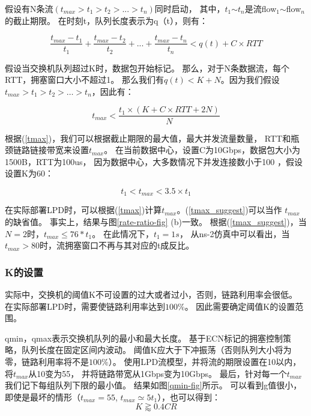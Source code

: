 假设有N条流$(t_{max}> t_1> t_2> ...> t_n)$同时启动，
其中，$t_1$$\sim$$t_n$是流flow$_1$$\sim$flow$_n$的截止期限。
在时刻t，队列长度表示为q（t），则有：

\begin{equation}
\label{tmaxprocess}
\frac{t_{max}-t_1}{t_1}+\frac{t_{max}-t_2}{t_2}+...+\frac{t_{max}-t_n}{t_n} <q(t)+C\times RTT
\end{equation}



假设当交换机队列超过K时，数据包开始标记。
那么，对于N条数据流，每个RTT，拥塞窗口大小不超过1。
那么我们有$q(t) < K+N$。因为我们假设$t_{max}>t_1>t_2>…>t_n$，因此有：


\begin{equation}
\label{tmax}
t_{max}<\frac{t_1\times(K+C\times RTT+2N)}{N}
\end{equation}

根据(\ref{tmax})，我们可以根据截止期限的最大值，最大并发流量数量，
RTT和瓶颈链路链接带宽来设置$t_{max}$。 
在当前数据中心，设置C为10Gbps，数据包大小为1500B，RTT为100us，
因为数据中心，大多数情况下并发连接数小于100 \cite{DCTCP}，假设设置K为60：


 \begin{equation}
\label{tmax_suggest}
t_1< t_{max}<3.5\times t_1
\end{equation}

在实际部署LPD时，可以根据(\ref{tmax})计算$t_{max}$。(\ref{tmax_suggest})可以当作 $t_{max}$的缺省值。
事实上，结果与图\ref{rate-ratio-fig} (b)一致。 
根据(\ref{tmax_suggest})，当$N = 2$时，$t_{max}\le76* t_1$。
在此情况下，$t_1 = 1s$， 从ns-2仿真中可以看出，当$t_{max}> 80$时，流拥塞窗口不再与其对应的t成反比。

\subsubsection{K的设置}
实际中，交换机的阈值K不可设置的过大或者过小，否则，链路利用率会很低。
在实际部署LPD时，需要使链路利用率达到$100\%$。
因此需要确定阈值K的设置范围\cite{DCTCPAnalysis}。

qmin，qmax表示交换机队列的最小和最大长度。
基于ECN标记的拥塞控制策略，队列长度在固定区间内波动。
阈值K应大于下冲振荡（否则队列大小将为零，链路利用率将不是$100\%$）。 
使用LPD流模型，并将流的期限设置在10以内，将$t_{max}$从10变为55，
并将链路带宽从1Gbps变为10Gbps。 
最后，针对每一个$t_{max}$我们记下每组队列下限的最小值。
结果如图\ref{qmin-fig}所示。
可以看到g值很小，即使是最坏的情形（$t_{max} = 55$, $t_{max}\simeq 5 t_1$），也可以得到：
\begin{equation}
\label{KRANGE}
K \gtrapprox0.4 CR
\end{equation}


